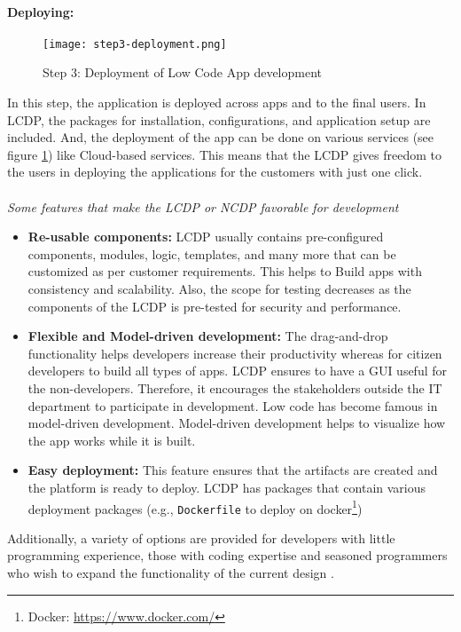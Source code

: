 \paragraph*{Deploying:}
\begin{figure}[htbp!]
  \centering    
  \texttt{[image: step3-deployment.png]}
  \caption[Testing]{Step 3: Deployment of Low Code App development}
  \label{fig:background:deploying}
\end{figure}
In this step, the application is deployed across apps and to the final users.
In LCDP, the packages for installation, configurations, and application setup are included.
And, the deployment of the app can be done on various services (see figure \ref{fig:background:deploying}) like Cloud-based services.
This means that the LCDP gives freedom to the users in deploying the applications for the customers with just one click.  \\\\
\textit{Some features that make the LCDP or NCDP favorable for development} \cite{article:nocode:sahina, article:nocode:ihirwe, paper:lowcode:cabot}
\begin{itemize}
  \item \textbf{Re-usable components:} LCDP usually contains pre-configured components, modules, logic, templates, and many more that can be customized as per customer requirements. This helps to Build apps with consistency and scalability. Also, the scope for testing decreases as the components of the LCDP is pre-tested for security and performance. 
  \item \textbf{Flexible and Model-driven development:} The drag-and-drop functionality helps developers increase their productivity whereas for citizen developers to build all types of apps. LCDP ensures to have a GUI useful for the non-developers. Therefore, it encourages the stakeholders outside the IT department to participate in development. Low code has become famous in model-driven development. Model-driven development helps to visualize how the app works while it is built.
  \item \textbf{Easy deployment:} This feature ensures that the artifacts are created and the platform is ready to deploy. LCDP has packages that contain various deployment packages (e.g., \texttt{Dockerfile} to deploy on docker\footnote{Docker: \url{https://www.docker.com/}})
\end{itemize}

Additionally, a variety of options are provided for developers with little programming experience, those with coding expertise and seasoned programmers who wish to expand the functionality of the current design \cite{article:nocode:sahina}.

